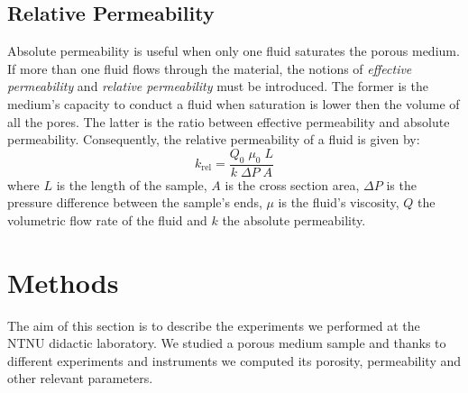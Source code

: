 \documentclass[10pt, a4paper]{amsart}
\begin{document}
\subsection{Relative Permeability}
Absolute permeability is useful when only one fluid saturates the porous medium. If more than one fluid flows through the material, the notions of \textit{effective permeability} and \textit{relative permeability} must be introduced. The former is the medium's capacity to conduct a fluid when saturation is lower then the volume of all the pores. The latter is the ratio between effective permeability and absolute permeability. Consequently, the relative permeability of a fluid is given by:
\begin{equation}
    k_\mathrm{rel} = \frac{Q_0\;\mu_0\;L}{k\;\Delta P\;A}
\end{equation}
where $L$ is the length of the sample, $A$ is the cross section area, $\Delta P$ is the pressure difference between the sample's ends, $\mu$ is the fluid's viscosity, $Q$ the volumetric flow rate of the fluid and $k$ the absolute permeability. 

\section{Methods}\label{sec:methods}
The aim of this section is to describe the experiments we performed at the NTNU didactic laboratory. We studied a porous medium sample and thanks to different experiments and instruments we computed its porosity, permeability and other relevant parameters.
\end{document}
